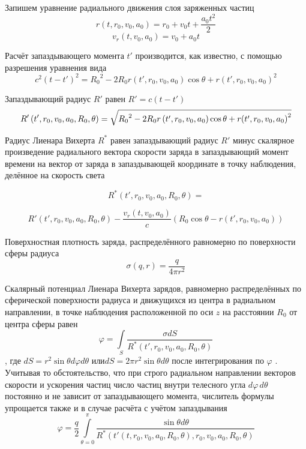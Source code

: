 \documentclass[12pt]{article}
\begin{document}
Запишем уравнение радиального движения слоя заряженных частиц
	\[r\left( t,{{r}_{0}},{{v}_{0}},{{a}_{0}} \right)={{r}_{0}}+{{v}_{0}}t+\frac{{{a}_{0}}{{t}^{2}}}{2}\] 	
	\[{{v}_{r}}\left( t,{{v}_{0}},{{a}_{0}} \right)={{v}_{0}}+{{a}_{0}}t\] 	

Расчёт запаздывающего момента $t'$ производится, как известно, с помощью разрешения уравнения вида
	\[{{c}^{2}}{{\left( t-t' \right)}^{2}}={{R}_{0}}^{2}-2{{R}_{0}}r\left( t',{{r}_{0}},{{v}_{0}},{{a}_{0}} \right)\cos \theta +r{{\left( t',{{r}_{0}},{{v}_{0}},{{a}_{0}} \right)}^{2}}\] 	

Запаздывающий радиус $R'$  равен $R'=c\left( t-t' \right)$
	\[R'\left( t',{{r}_{0}},{{v}_{0}},{{a}_{0}},{{R}_{0}},\theta  \right) = \\
\sqrt{{{R}_{0}}^{2}-2{{R}_{0}}r\left( t',{{r}_{0}},{{v}_{0}},{{a}_{0}} \right)\cos \theta + r{{\left( t',{{r}_{0}},{{v}_{0}},{{a}_{0}} \right)}^{2}}}\] 

Радиус Лиенара Вихерта ${{R}^{*}}$ равен запаздывающий радиус $R'$ минус скалярное произведение радиального вектора скорости заряда в запаздывающий момент времени на вектор от заряда в запаздывающей координате в точку наблюдения, делённое на скорость света

	\[{{R}^{*}}\left( t',{{r}_{0}},{{v}_{0}},{{a}_{0}},{{R}_{0}},\theta  \right) = \]

\[R'\left( t',{{r}_{0}},{{v}_{0}},{{a}_{0}},{{R}_{0}},\theta  \right) - \frac{{{v}_{r}}\left( t,{{v}_{0}},{{a}_{0}} \right)}{c}\left( {{R}_{0}}\cos \theta - r\left( t',{{r}_{0}},{{v}_{0}},{{a}_{0}} \right) \right)\]
	
Поверхностная плотность заряда, распределённого равномерно по поверхности сферы радиуса
	\[\sigma \left( q,r \right)=\frac{q}{4\pi {{r}^{2}}}\] 	

Скалярный потенциал Лиенара Вихерта зарядов, равномерно распределённых по сферической поверхности радиуса  и движущихся из центра в радиальном направлении, в точке наблюдения расположенной по оси $z$  на расстоянии ${{R}_{0}}$ от центра сферы равен \[\varphi =\int\limits_{S}{\frac{\sigma dS}{{{R}^{*}}\left( t',{{r}_{0}},{{v}_{0}},{{a}_{0}},{{R}_{0}},\theta  \right)}}\], где $dS={{r}^{2}}\sin \theta d\varphi d\theta $  или$dS=2\pi {{r}^{2}}\sin \theta d\theta $ после интегрирования по $\varphi $ . Учитывая то обстоятельство, что при строго радиальном направлении векторов скорости и ускорения частиц число частиц внутри телесного угла $d\varphi\, d\theta $ постоянно и не зависит от запаздывающего момента, числитель формулы упрощается также и в случае расчёта с учётом запаздывания
	\[\varphi =\frac{q}{2}\int\limits_{\theta =0}^{\pi }{\frac{\sin \theta d\theta }{{{R}^{*}}\left( t'\left( t,{{r}_{0}},{{v}_{0}},{{a}_{0}},{{R}_{0}},\theta  \right),{{r}_{0}},{{v}_{0}},{{a}_{0}},{{R}_{0}},\theta  \right)}}\] 	
\end{document}
